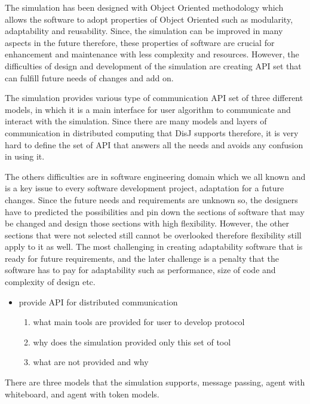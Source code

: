 The simulation has been designed with Object Oriented methodology which allows the software to adopt properties of Object Oriented such as modularity, adaptability and reusability. Since, the simulation can be improved in many aspects in the future therefore, these properties of software are crucial for enhancement and maintenance with less complexity and resources. However, the difficulties of design and development of the simulation are creating API set that can fulfill future needs of changes and add on.

The simulation provides various type of communication API set of three different models, in which it is a main interface for user algorithm to communicate and interact with the simulation. Since there are many models and layers of communication in distributed computing that DisJ supports therefore, it is very hard to define the set of API that answers all the needs and avoids any confusion in using it.

The others difficulties are in software engineering domain which we all known and is a key issue to every software development project, adaptation for a future changes. Since the future needs and requirements are unknown so, the designers have to predicted the possibilities and pin down the sections of software that may be changed and design those sections with high flexibility. However, the other sections that were not selected still cannot be overlooked therefore flexibility still apply to it as well. The most challenging in creating adaptability software that is ready for future requirements, and the later challenge is a penalty that the software has to pay for adaptability such as performance, size of code and complexity of design etc.

\begin{itemize}
\item provide API for distributed communication
    \begin{enumerate}
    \item what main tools are provided for user to develop protocol
    \item why does the simulation provided only this set of tool
    \item what are not provided and why
    \end{enumerate}
\end{itemize}

There are three models that the simulation supports, message passing, agent with whiteboard, and agent with token models.

